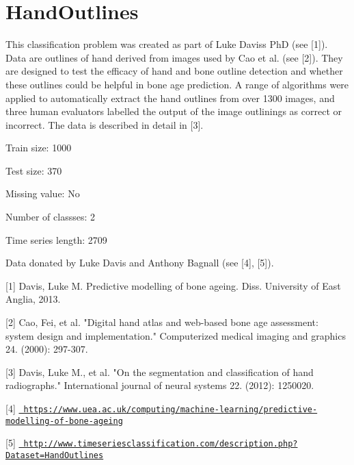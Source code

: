 \chapter{Hand\+Outlines}
\hypertarget{md_external_2data_2UCRArchive__2018_2HandOutlines_2README}{}\label{md_external_2data_2UCRArchive__2018_2HandOutlines_2README}
\label{md_external_2data_2UCRArchive__2018_2HandOutlines_2README_autotoc_md117}%
%
 This classification problem was created as part of Luke Davis\textquotesingle{}s PhD (see \mbox{[}1\mbox{]}). Data are outlines of hand derived from images used by Cao et al. (see \mbox{[}2\mbox{]}). They are designed to test the efficacy of hand and bone outline detection and whether these outlines could be helpful in bone age prediction. A range of algorithms were applied to automatically extract the hand outlines from over 1300 images, and three human evaluators labelled the output of the image outlinings as correct or incorrect. The data is described in detail in \mbox{[}3\mbox{]}.

Train size\+: 1000

Test size\+: 370

Missing value\+: No

Number of classses\+: 2

Time series length\+: 2709

Data donated by Luke Davis and Anthony Bagnall (see \mbox{[}4\mbox{]}, \mbox{[}5\mbox{]}).

\mbox{[}1\mbox{]} Davis, Luke M. Predictive modelling of bone ageing. Diss. University of East Anglia, 2013.

\mbox{[}2\mbox{]} Cao, Fei, et al. "{}\+Digital hand atlas and web-\/based bone age assessment\+: system design and implementation."{} Computerized medical imaging and graphics 24. (2000)\+: 297-\/307.

\mbox{[}3\mbox{]} Davis, Luke M., et al. "{}\+On the segmentation and classification of hand radiographs."{} International journal of neural systems 22. (2012)\+: 1250020.

\mbox{[}4\mbox{]} \href{https://www.uea.ac.uk/computing/machine-learning/predictive-modelling-of-bone-ageing}{\texttt{ https\+://www.\+uea.\+ac.\+uk/computing/machine-\/learning/predictive-\/modelling-\/of-\/bone-\/ageing}}

\mbox{[}5\mbox{]} \href{http://www.timeseriesclassification.com/description.php?Dataset=HandOutlines}{\texttt{ http\+://www.\+timeseriesclassification.\+com/description.\+php?\+Dataset=\+Hand\+Outlines}} 